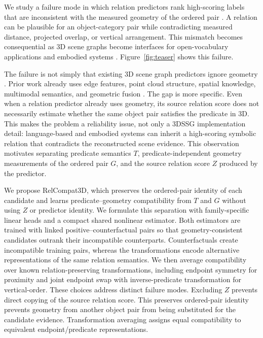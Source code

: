 We study a failure mode in which relation predictors rank high-scoring labels that are inconsistent with the measured geometry of the ordered pair \cite{nguyen2026relwitness,neau2026visual}. A relation can be plausible for an object-category pair while contradicting measured distance, projected overlap, or vertical arrangement. This mismatch becomes consequential as 3D scene graphs become interfaces for open-vocabulary applications and embodied systems \cite{koch2024open3dsg,hou2025fross,zhang2025open,wang2025open,saxena2025zing,fei2026open,madhavaram2026vizor}. Figure~\ref{fig:teaser} shows this failure.

The failure is not simply that existing 3D scene graph predictors ignore geometry \cite{wald2020learning}. Prior work already uses edge features, point cloud structure, spatial knowledge, multimodal semantics, and geometric fusion \cite{zhang2021exploiting,feng20233d,wang2023vl,koch2024sgrec3d,chen2024clip}. The gap is more specific. Even when a relation predictor already uses geometry, its source relation score does not necessarily estimate whether the same object pair satisfies the predicate in 3D. This makes the problem a reliability issue, not only a 3DSSG implementation detail: language-based and embodied systems can inherit a high-scoring symbolic relation that contradicts the reconstructed scene evidence. This observation motivates separating predicate semantics $T$, predicate-independent geometry measurements of the ordered pair $G$, and the source relation score $Z$ produced by the
predictor.

We propose RelCompat3D, which preserves the ordered-pair identity of each candidate and learns predicate--geometry compatibility from $T$ and $G$ without using $Z$ or predictor identity. We formulate this separation with family-specific linear heads and a compact shared nonlinear estimator. Both estimators are trained with linked positive--counterfactual pairs so that geometry-consistent candidates outrank their incompatible counterparts. Counterfactuals create incompatible training pairs, whereas the transformations encode alternative representations of the same relation semantics. We then average compatibility over known relation-preserving transformations, including endpoint symmetry for proximity and joint endpoint swap with inverse-predicate transformation for vertical-order. These choices address distinct failure modes. Excluding $Z$ prevents direct copying of the source relation score. This preserves ordered-pair identity prevents geometry from another object pair from being substituted for the candidate evidence. Transformation averaging assigns equal compatibility to equivalent endpoint/predicate representations. 

